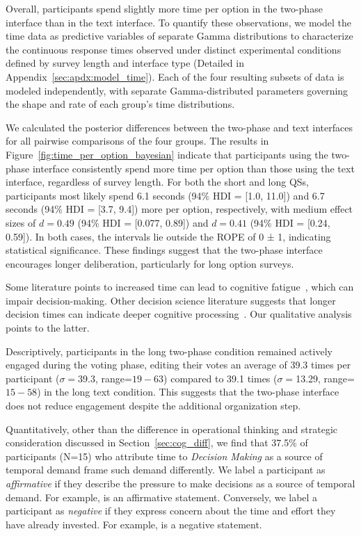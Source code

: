 Overall, participants spend slightly more time per option in the two-phase interface than in the text interface. To quantify these observations, we model the time data as predictive variables of separate Gamma distributions to characterize the continuous response times observed under distinct experimental conditions defined by survey length and interface type (Detailed in Appendix~\ref{sec:apdx:model_time}). Each of the four resulting subsets of data is modeled independently, with separate Gamma-distributed parameters governing the shape and rate of each group's time distributions. 

We calculated the posterior differences between the two-phase and text interfaces for all pairwise comparisons of the four groups. The results in Figure~\ref{fig:time_per_option_bayesian} indicate that participants using the two-phase interface consistently spend more time per option than those using the text interface, regardless of survey length. For both the short and long QSs, participants most likely spend 6.1 seconds (94\% HDI = [1.0, 11.0]) and 6.7 seconds (94\% HDI = [3.7, 9.4]) more per option, respectively, with medium effect sizes of $d=0.49$ (94\% HDI = [0.077, 0.89]) and $d=0.41$ (94\% HDI = [0.24, 0.59]). In both cases, the intervals lie outside the ROPE of 0 ± 1, indicating statistical significance. These findings suggest that the two-phase interface encourages longer deliberation, particularly for long option surveys.

Some literature points to increased time can lead to cognitive fatigue~\cite{kundingerReliableGroundTruth2020, karim2024examining}, which can impair decision-making. Other decision science literature suggests that longer decision times can indicate deeper cognitive processing~\cite{payneAdaptiveDecisionMaker1993, daniel2017thinking}. Our qualitative analysis points to the latter.

Descriptively, participants in the long two-phase condition remained actively engaged during the voting phase, editing their votes an average of 39.3 times per participant ($\sigma=$39.3, range=$19-63$) compared to 39.1 times ($\sigma=$13.29, range=$15-58$) in the long text condition. This suggests that the two-phase interface does not reduce engagement despite the additional organization step.

Quantitatively, other than the difference in operational thinking and strategic consideration discussed in Section~\ref{sec:cog_diff}, we find that 37.5\% of participants (N=15) who attribute time to \textit{Decision Making} as a source of temporal demand frame such demand differently. We label a participant as \textit{affirmative} if they describe the pressure to make decisions as a source of temporal demand. For example,  is an affirmative statement. Conversely, we label a participant as \textit{negative} if they express concern about the time and effort they have already invested. For example,  is a negative statement.


